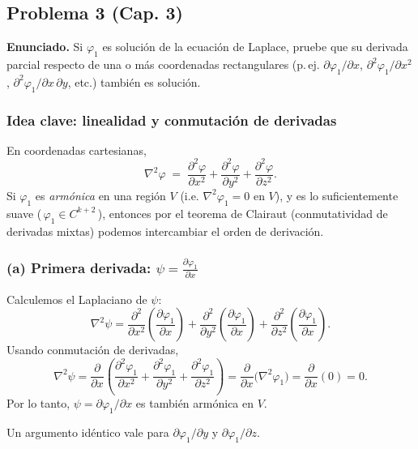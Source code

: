\documentclass{article}
\begin{document}
\subsection{Problema 3 (Cap. 3)} \vspace{0.5cm}

\textbf{Enunciado.} Si $\varphi_{1}$ es solución de la ecuación de Laplace, pruebe que su derivada parcial respecto de una o más coordenadas rectangulares (p.\,ej. $\partial \varphi_{1}/\partial x$, $\partial^{2}\varphi_{1}/\partial x^{2}$, $\partial^{2}\varphi_{1}/\partial x\,\partial y$, etc.) también es solución.

\subsubsection*{Idea clave: linealidad y conmutación de derivadas}
En coordenadas cartesianas,
\[
\nabla^{2}\varphi \;=\; \frac{\partial^{2}\varphi}{\partial x^{2}}
+\frac{\partial^{2}\varphi}{\partial y^{2}}
+\frac{\partial^{2}\varphi}{\partial z^{2}}.
\]
Si $\varphi_{1}$ es \emph{armónica} en una región $V$ (i.e. $\nabla^{2}\varphi_{1}=0$ en $V$), y es lo suficientemente suave (\,$\varphi_{1}\in C^{k+2}$\,), entonces por el teorema de Clairaut (conmutatividad de derivadas mixtas) podemos intercambiar el orden de derivación.

\subsubsection*{(a) Primera derivada: $\displaystyle \psi=\frac{\partial \varphi_{1}}{\partial x}$}
Calculemos el Laplaciano de $\psi$:
\[
\nabla^{2}\psi
=\frac{\partial^{2}}{\partial x^{2}}\!\left(\frac{\partial \varphi_{1}}{\partial x}\right)
+\frac{\partial^{2}}{\partial y^{2}}\!\left(\frac{\partial \varphi_{1}}{\partial x}\right)
+\frac{\partial^{2}}{\partial z^{2}}\!\left(\frac{\partial \varphi_{1}}{\partial x}\right).
\]
Usando conmutación de derivadas,
\[
\nabla^{2}\psi
=\frac{\partial}{\partial x}\!\left(
\frac{\partial^{2}\varphi_{1}}{\partial x^{2}}
+\frac{\partial^{2}\varphi_{1}}{\partial y^{2}}
+\frac{\partial^{2}\varphi_{1}}{\partial z^{2}}
\right)
=\frac{\partial}{\partial x}\big(\nabla^{2}\varphi_{1}\big)=\frac{\partial}{\partial x}(0)=0.
\]
Por lo tanto, $\psi=\partial \varphi_{1}/\partial x$ es también armónica en $V$.

Un argumento idéntico vale para $\partial\varphi_{1}/\partial y$ y $\partial\varphi_{1}/\partial z$.
\end{document}
